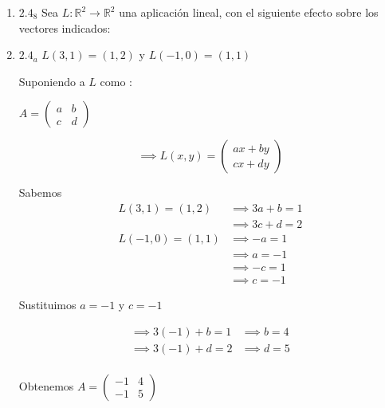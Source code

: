 \documentclass{article}
\begin{document}
		\begin{enumerate}
			
			\item[] \(2.4_8\) Sea \(L:\mathbb{R}^2 \to \mathbb{R}^2\) una aplicación lineal, con el siguiente efecto sobre los vectores indicados:
			
			\item \(2.4_a\) \(L(3,1)=(1,2)\) y \(L(-1,0)=(1,1)\)
			
			Suponiendo a \(L\) como : 
			
			\(
			A=
			\begin{pmatrix}
					a & b \\
					c & d
			\end{pmatrix}
			\)
			
			\begin{equation*}
				\implies L(x,y)=
				\begin{pmatrix}
					ax + by\\
					cx + dy
				\end{pmatrix}
			\end{equation*}
			
			Sabemos
			\begin{equation*}
				\begin{aligned}
					L(3,1)=(1,2) &\implies 3a+b=1 \\
						          &\implies 3c+d=2 \\
					L(-1,0) =(1,1) &\implies -a=1 \\
									&\implies a=-1 \\
									&\implies -c=1 \\
									&\implies c=-1 
				\end{aligned}
			\end{equation*}
			
			Sustituimos \(a=-1\) y \(c=-1\)
			
			\begin{equation*}
				\begin{aligned}
					\implies 3(-1)+b=1 &\implies b=4 \\
					\implies 3(-1)+d=2 &\implies d=5 \\
				\end{aligned}
			\end{equation*}
			
			Obtenemos
			\(
			A=
			\begin{pmatrix}
				-1 & 4 \\
				-1 & 5
			\end{pmatrix}
			\)
			

\end{enumerate}
\end{document}
